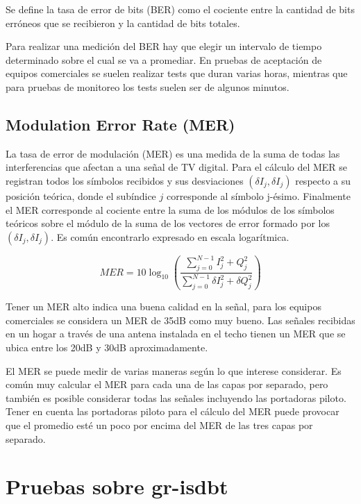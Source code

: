 Se define la tasa de error de bits (BER) como el cociente entre la cantidad de bits erróneos que se recibieron y la cantidad de bits totales.

Para realizar una medición del BER hay que elegir un intervalo de tiempo determinado sobre el cual se va a promediar. En pruebas de aceptación de equipos comerciales se suelen realizar tests que duran varias horas, mientras que para pruebas de monitoreo los tests suelen ser de algunos minutos.



\subsection{Modulation Error Rate (MER)}
La tasa de error de modulación (MER) es una medida de la suma de todas las interferencias que afectan a una señal de TV digital. Para el cálculo del MER se registran todos los símbolos recibidos y sus desviaciones $(\delta I_{j}, \delta I_{j})$ respecto a su posición teórica, donde el subíndice $j$ corresponde al símbolo j-ésimo. Finalmente el MER corresponde al cociente entre la suma de los módulos de los símbolos teóricos sobre el módulo de la suma de los vectores de error formado por los $(\delta I_{j}, \delta I_{j})$. Es común encontrarlo expresado en escala logarítmica. 


\begin{equation}
MER = 10 \log_{10} \left( \dfrac{\sum_{j = 0}^{N-1} I_{j}^{2}+ Q_{j}^{2}}{\sum_{j = 0}^{N-1}\delta I_{j}^{2}+\delta Q_{j}^{2}} \right )
\end{equation}


Tener un MER alto indica una buena calidad en la señal, para los equipos comerciales se considera un MER de 35dB como muy bueno. Las señales recibidas en un hogar a través de una antena instalada en el techo tienen un MER que se ubica entre los 20dB y 30dB aproximadamente. 

El MER se puede medir de varias maneras según lo que interese considerar. Es común muy calcular el MER para cada una de las capas por separado, pero también es posible considerar todas las señales incluyendo las portadoras piloto. Tener en cuenta las portadoras piloto para el cálculo del MER puede provocar que el promedio esté un poco por encima del MER de las tres capas por separado.


\section{Pruebas sobre gr-isdbt}

